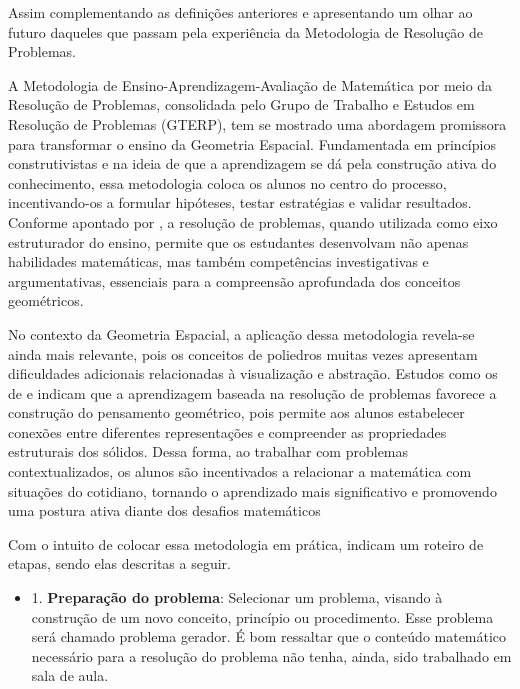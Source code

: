 Assim complementando as definições anteriores e apresentando um olhar ao futuro daqueles que passam pela experiência da Metodologia de Resolução de Problemas.

A Metodologia de Ensino-Aprendizagem-Avaliação de Matemática por meio da Resolução de Problemas, consolidada pelo Grupo de Trabalho e Estudos em Resolução de Problemas (GTERP), tem se mostrado uma abordagem promissora para transformar o ensino da Geometria Espacial. Fundamentada em princípios construtivistas e na ideia de que a aprendizagem se dá pela construção ativa do conhecimento, essa metodologia coloca os alunos no centro do processo, incentivando-os a formular hipóteses, testar estratégias e validar resultados. Conforme apontado por , a resolução de problemas, quando utilizada como eixo estruturador do ensino, permite que os estudantes desenvolvam não apenas habilidades matemáticas, mas também competências investigativas e argumentativas, essenciais para a compreensão aprofundada dos conceitos geométricos.

No contexto da Geometria Espacial, a aplicação dessa metodologia revela-se ainda mais relevante, pois os conceitos de poliedros muitas vezes apresentam dificuldades adicionais relacionadas à visualização e abstração. Estudos como os de  e  indicam que a aprendizagem baseada na resolução de problemas favorece a construção do pensamento geométrico, pois permite aos alunos estabelecer conexões entre diferentes representações e compreender as propriedades estruturais dos sólidos. Dessa forma, ao trabalhar com problemas contextualizados, os alunos são incentivados a relacionar a matemática com situações do cotidiano, tornando o aprendizado mais significativo e promovendo uma postura ativa diante dos desafios matemáticos

Com o intuito de colocar essa metodologia em prática,  indicam um roteiro de etapas, sendo elas descritas a seguir.


\begin{itemize}
    \item 1. \textbf{Preparação do problema}: Selecionar um problema, visando à construção de um novo conceito, princípio ou procedimento. Esse problema será chamado problema gerador. É bom ressaltar que o conteúdo matemático necessário para a resolução do problema não tenha, ainda, sido trabalhado em sala de aula. 
\end{itemize}

